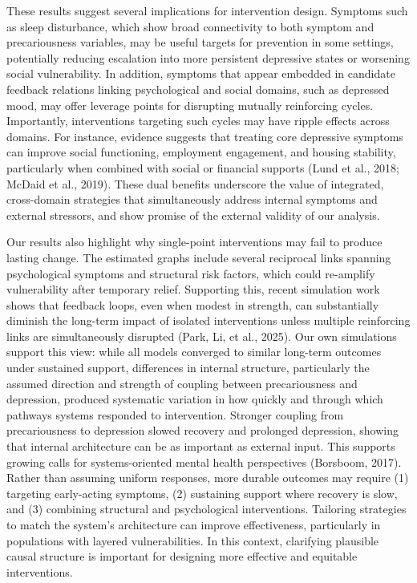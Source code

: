 \documentclass[
]{article}
\begin{document}
These results suggest several implications for intervention design.
Symptoms such as sleep disturbance, which show broad connectivity to
both symptom and precariousness variables, may be useful targets for
prevention in some settings, potentially reducing escalation into more
persistent depressive states or worsening social vulnerability. In
addition, symptoms that appear embedded in candidate feedback relations
linking psychological and social domains, such as depressed mood, may
offer leverage points for disrupting mutually reinforcing cycles.
Importantly, interventions targeting such cycles may have ripple effects
across domains. For instance, evidence suggests that treating core
depressive symptoms can improve social functioning, employment
engagement, and housing stability, particularly when combined with
social or financial supports (Lund et al., 2018; McDaid et al., 2019).
These dual benefits underscore the value of integrated, cross-domain
strategies that simultaneously address internal symptoms and external
stressors, and show promise of the external validity of our analysis.

Our results also highlight why single-point interventions may fail to
produce lasting change. The estimated graphs include several reciprocal
links spanning psychological symptoms and structural risk factors, which
could re-amplify vulnerability after temporary relief. Supporting this,
recent simulation work shows that feedback loops, even when modest in
strength, can substantially diminish the long-term impact of isolated
interventions unless multiple reinforcing links are simultaneously
disrupted (Park, Li, et al., 2025). Our own simulations support this
view: while all models converged to similar long-term outcomes under
sustained support, differences in internal structure, particularly the
assumed direction and strength of coupling between precariousness and
depression, produced systematic variation in how quickly and through
which pathways systems responded to intervention. Stronger coupling from
precariousness to depression slowed recovery and prolonged depression,
showing that internal architecture can be as important as external
input. This supports growing calls for systems-oriented mental health
perspectives (Borsboom, 2017). Rather than assuming uniform responses,
more durable outcomes may require (1) targeting early-acting symptoms,
(2) sustaining support where recovery is slow, and (3) combining
structural and psychological interventions. Tailoring strategies to
match the system's architecture can improve effectiveness, particularly
in populations with layered vulnerabilities. In this context, clarifying
plausible causal structure is important for designing more effective and
equitable interventions.
\end{document}
